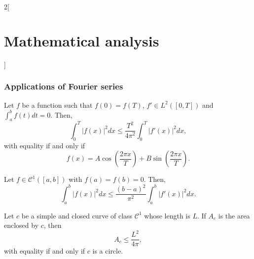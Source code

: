 \documentclass[class=article,crop=false]{standalone}
\begin{document}
\begin{multicols}{2}[\section{Mathematical analysis}]
\subsubsection*{Applications of Fourier series}
\begin{theorem}
Let $f$ be a function such that $f(0)=f(T)$, $f'\in L^2([0,T])$ and $\displaystyle\int_a^bf(t)dt=0$. Then, $$\int_0^T|f(x)|^2dx\leq\frac{T^2}{4\pi^2}\int_0^T|f'(x)|^2dx,$$ with equality if and only if $$f(x)=A\cos\left(\frac{2\pi x}{T}\right)+B\sin\left(\frac{2\pi x}{T}\right).$$
\end{theorem}
\begin{theorem}
Let $f\in \mathcal{C}^1([a,b])$ with $f(a)=f(b)=0$. Then, $$\int_a^b|f(x)|^2dx\leq\frac{(b-a)^2}{\pi^2}\int_a^b|f'(x)|^2dx.$$
\end{theorem}
\begin{theorem}
Let $c$ be a simple and closed curve of class $\mathcal{C}^1$ whose length is $L$. If $A_c$ is the area enclosed by $c$, then $$A_c\leq\frac{L^2}{4\pi},$$ with equality if and only if $c$ is a circle.
\end{theorem}
\end{multicols}
\end{document}
